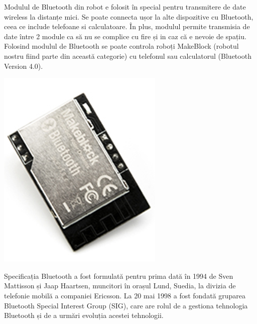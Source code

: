 \documentclass[12pt,a4paper]{article}
\begin{document}
	\par Modulul de Bluetooth din robot e folosit în special pentru transmitere de date wireless la distanțe mici. Se poate connecta ușor la alte dispozitive cu Bluetooth, ceea ce include telefoane si calculatoare. În plus, modulul permite transmisia de date între 2 module ca să nu se complice cu fire și in caz că e nevoie de spațiu. Folosind modulul de Bluetooth se poate controla roboți MakeBlock (robotul nostru fiind parte din această categorie) cu telefonul sau calculatorul (Bluetooth Version 4.0).
	
	\begin{center}
		\includegraphics[scale=0.25]{bluetoothmodule.png}
	\end{center}

	\par Specificația Bluetooth a fost formulată pentru prima dată în 1994 de Sven Mattisson și Jaap Haartsen, muncitori în orașul Lund, Suedia, la divizia de telefonie mobilă a companiei Ericsson. La 20 mai 1998 a fost fondată gruparea Bluetooth Special Interest Group (SIG), care are rolul de a gestiona tehnologia Bluetooth și de a urmări evoluția acestei tehnologii.
	
\end{document}
